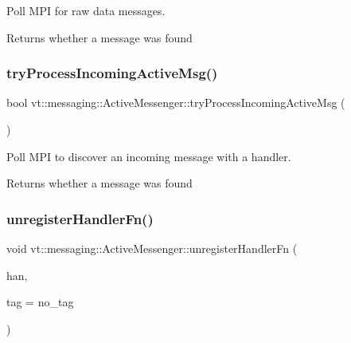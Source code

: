 Poll M\+PI for raw data messages. 

\begin{DoxyReturn}{Returns}
whether a message was found 
\end{DoxyReturn}
\mbox{\label{structvt_1_1messaging_1_1_active_messenger_a65ec9bc6f62213cac6320ea76cdd4d47}} 
\subsubsection{\texorpdfstring{try\+Process\+Incoming\+Active\+Msg()}{tryProcessIncomingActiveMsg()}}
{\footnotesize\ttfamily bool vt\+::messaging\+::\+Active\+Messenger\+::try\+Process\+Incoming\+Active\+Msg (\begin{DoxyParamCaption}{ }\end{DoxyParamCaption})}



Poll M\+PI to discover an incoming message with a handler. 

\begin{DoxyReturn}{Returns}
whether a message was found 
\end{DoxyReturn}
\mbox{\label{structvt_1_1messaging_1_1_active_messenger_a1f3defb40c1a5700c3d6cafae09ef7c6}} 
\subsubsection{\texorpdfstring{unregister\+Handler\+Fn()}{unregisterHandlerFn()}}
{\footnotesize\ttfamily void vt\+::messaging\+::\+Active\+Messenger\+::unregister\+Handler\+Fn (\begin{DoxyParamCaption}\item[{\hyperlink{namespacevt_af64846b57dfcaf104da3ef6967917573}{Handler\+Type} const}]{han,  }\item[{\hyperlink{namespacevt_a84ab281dae04a52a4b243d6bf62d0e52}{Tag\+Type} const \&}]{tag = {\ttfamily no\+\_\+tag} }\end{DoxyParamCaption})}



